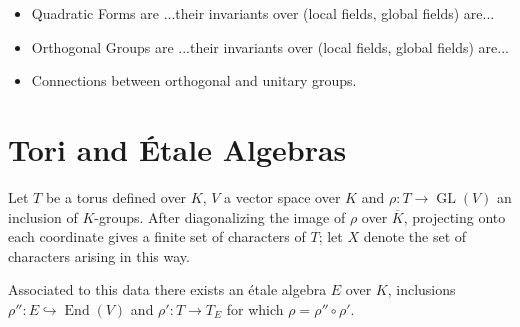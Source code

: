 \documentclass{article}
\theoremstyle{plain}
\newtheorem{example}[theorem]{Example}
\theoremstyle{definition}
\newtheorem{remark}[theorem]{Remark}
\DeclareMathOperator{\End}{End}
\DeclareMathOperator{\GL}{GL}
\newcommand{\Kb}{\overline{K}}
\begin{document}
\begin{itemize}
\begin{remark}
\begin{example}
In either case we have that $A^1(R) = \{ g\in (A\otimes_K R)^\times \mid N_{A/K} = 1 \}$ acts by left multiplication on $A$ and preserves the norm form and thus both Hermitian forms. By base changing to $\overline{K}$ we redily verify that $A^1 = SU(H_i)$ for $i=1,2$.

Over a local field the two isomorphism classes of $E_i$-Hermitian spaces arise from the two isomorphism classes of Quaternion algebra.
Consequently both $E_1$ special unitary groups are isomorphic to $E_2$ special unitary groups.
How isomorphism classes pair off is controlled by $(\delta_1,\delta_2)$.
\end{example}
\end{remark}





 





\item Quadratic Forms are ...their invariants over (local fields, global fields) are...
\item Orthogonal Groups are ...their invariants over (local fields, global fields) are...
\item Connections between orthogonal and unitary groups.
\end{itemize}


\section{Tori and \'Etale Algebras}

Let $T$ be a torus defined over $K$, $V$ a vector space over $K$ and $\rho : T \rightarrow \GL(V)$ an inclusion of $K$-groups.  After diagonalizing the image of $\rho$ over $\Kb$, projecting onto each coordinate gives a finite set of characters of $T$; let $X$ denote the set of characters arising in this way. 

Associated to this data there exists an \'etale algebra $E$ over $K$, inclusions $\rho'' : E \hookrightarrow \End(V)$ and $\rho' : T \rightarrow T_E$ for which $\rho = \rho''\circ\rho'$.
\end{document}
